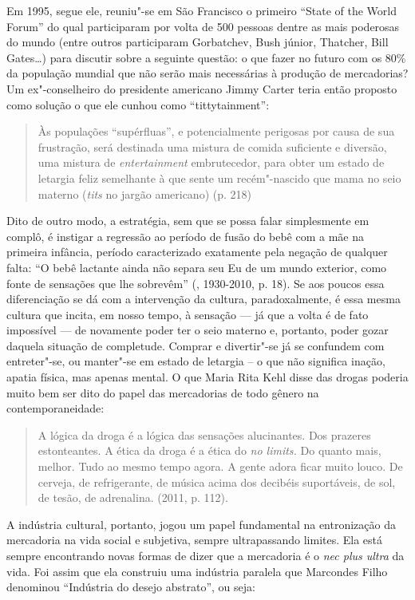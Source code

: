 Em 1995, segue ele, reuniu"-se em São Francisco o primeiro ``State of the
World Forum'' do qual participaram por volta de 500 pessoas dentre as
mais poderosas do mundo (entre outros participaram Gorbatchev, Bush
júnior, Thatcher, Bill Gates\ldots{}) para discutir sobre a seguinte questão:
o que fazer no futuro com os 80\% da população mundial que não serão
mais necessárias à produção de mercadorias? Um ex"-conselheiro do
presidente americano Jimmy Carter teria então proposto como solução o
que ele cunhou como ``tittytainment'':

\begin{quote}
Às populações ``supérfluas'', e potencialmente perigosas por causa de
sua frustração, será destinada uma mistura de comida suficiente e
diversão, uma mistura de \emph{entertainment} embrutecedor, para obter
um estado de letargia feliz semelhante à que sente um recém"-nascido que
mama no seio materno (\emph{tits} no jargão americano) (p. 218)
\end{quote}

Dito de outro modo, a estratégia, sem que se possa falar simplesmente em
complô, é instigar a regressão ao período de fusão do bebê com a mãe na
primeira infância, período caracterizado exatamente pela negação de
qualquer falta: ``O bebê lactante ainda não separa seu Eu de um mundo
exterior, como fonte de sensações que lhe sobrevêm'' (, 1930-2010,
p. 18). Se aos poucos essa diferenciação se dá com a intervenção da
cultura, paradoxalmente, é essa mesma cultura que incita, em nosso
tempo, à sensação --- já que a volta é de fato impossível --- de
novamente poder ter o seio materno e, portanto, poder gozar daquela
situação de completude. Comprar e divertir"-se já se confundem com
entreter"-se, ou manter"-se em estado de letargia -- o que não significa
inação, apatia física, mas apenas mental. O que Maria Rita Kehl disse
das drogas poderia muito bem ser dito do papel das mercadorias de todo
gênero na contemporaneidade:

\begin{quote}
A lógica da droga é a lógica das sensações alucinantes. Dos prazeres
estonteantes. A ética da droga é a ética do \emph{no limits.} Do quanto
mais, melhor. Tudo ao mesmo tempo agora. A gente adora ficar muito
louco. De cerveja, de refrigerante, de música acima dos decibéis
suportáveis, de sol, de tesão, de adrenalina. (2011, p. 112).
\end{quote}

A indústria cultural, portanto, jogou um papel fundamental na
entronização da mercadoria na vida social e subjetiva, sempre
ultrapassando limites. Ela está sempre encontrando novas formas de dizer
que a mercadoria é o \emph{nec plus ultra} da vida. Foi assim que ela
construiu uma indústria paralela que Marcondes Filho denominou
``Indústria do desejo abstrato'', ou seja:

